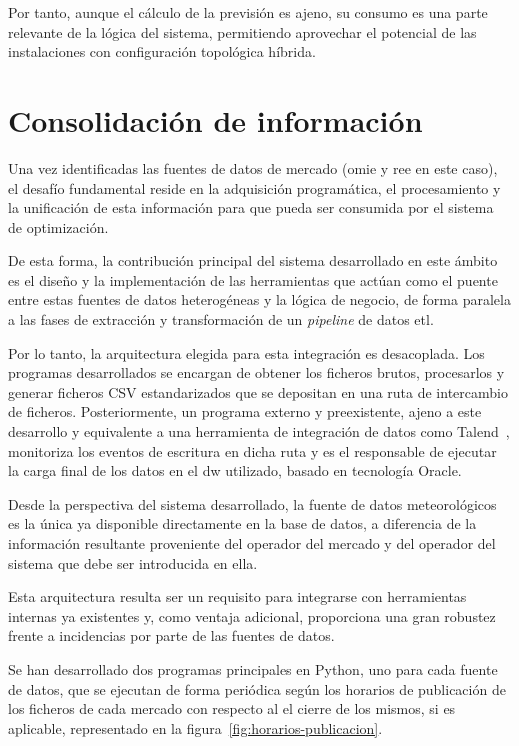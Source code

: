 Por tanto, aunque el cálculo de la previsión es ajeno, su consumo es una parte relevante de la lógica del sistema, permitiendo aprovechar el potencial de las instalaciones con configuración topológica híbrida.

\section{Consolidación de información}%
\label{makereference4.4}

Una vez identificadas las fuentes de datos de mercado (\gls{omie} y \gls{ree} en este caso), el desafío fundamental reside en la adquisición programática, el procesamiento y la unificación de esta información para que pueda ser consumida por el sistema de optimización.

De esta forma, la contribución principal del sistema desarrollado en este ámbito es el diseño y la implementación de las herramientas que actúan como el puente entre estas fuentes de datos heterogéneas y la lógica de negocio, de forma paralela a las fases de extracción y transformación de un \textit{pipeline} de datos \gls{etl}.

Por lo tanto, la arquitectura elegida para esta integración es desacoplada. Los programas desarrollados se encargan de obtener los ficheros brutos, procesarlos y generar ficheros CSV estandarizados que se depositan en una ruta de intercambio de ficheros. Posteriormente, un programa externo y preexistente, ajeno a este desarrollo y equivalente a una herramienta de integración de datos como Talend~\cite{talend2025modern}, monitoriza los eventos de escritura en dicha ruta y es el responsable de ejecutar la carga final de los datos en el \gls{dw} utilizado, basado en tecnología Oracle.

Desde la perspectiva del sistema desarrollado, la fuente de datos meteorológicos es la única ya disponible directamente en la base de datos, a diferencia de la información resultante proveniente del operador del mercado y del operador del sistema que debe ser introducida en ella.

Esta arquitectura resulta ser un requisito para integrarse con herramientas internas ya existentes y, como ventaja adicional, proporciona una gran robustez frente a incidencias por parte de las fuentes de datos.

Se han desarrollado dos programas principales en Python, uno para cada fuente de datos, que se ejecutan de forma periódica según los horarios de publicación de los ficheros de cada mercado con respecto al el cierre de los mismos, si es aplicable, representado en la figura~\ref{fig:horarios-publicacion}.

